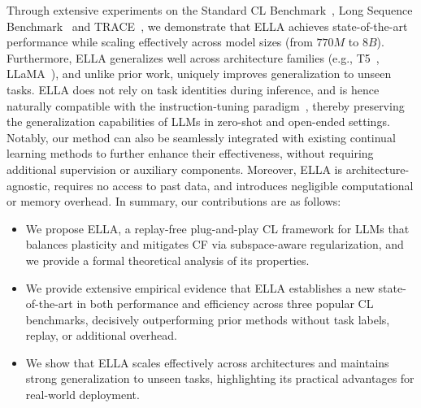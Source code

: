 \documentclass[11pt]{article}
\begin{document}
Through extensive experiments on the Standard CL Benchmark~\cite{zhang2015character}, Long Sequence Benchmark~\cite{razdaibiedina2023progressive} and TRACE~\cite{wang2023trace}, we demonstrate that ELLA achieves state-of-the-art performance while scaling effectively across model sizes (from $770M$ to $8B$). Furthermore, ELLA generalizes well across architecture families (e.g., T5~\cite{raffel2020exploring}, LLaMA~\cite{touvron2023llama}), and unlike prior work, uniquely improves generalization to unseen tasks. ELLA does not rely on task identities during inference, and is hence naturally compatible with the instruction-tuning paradigm~\cite{wang2022task}, thereby preserving the generalization capabilities of LLMs in zero-shot and open-ended settings. Notably, our method can also be seamlessly integrated with existing continual learning methods to further enhance their effectiveness, without requiring additional supervision or auxiliary components. Moreover, ELLA is architecture-agnostic, 
requires no access to past data, and introduces negligible computational or memory overhead. In summary, our contributions are as follows:
\begin{itemize}
\item %
We propose ELLA, a replay-free plug-and-play CL framework for LLMs that balances plasticity and mitigates CF via subspace-aware regularization, and we provide a formal theoretical analysis of its properties.
\item We provide extensive empirical evidence that ELLA establishes a new state-of-the-art in both performance and efficiency across three popular CL benchmarks, decisively outperforming prior methods without task labels, replay, or additional overhead.
\item We show that ELLA scales effectively across architectures and maintains strong generalization to unseen tasks, %
highlighting its practical advantages for real-world deployment.
\end{itemize}
\end{document}
